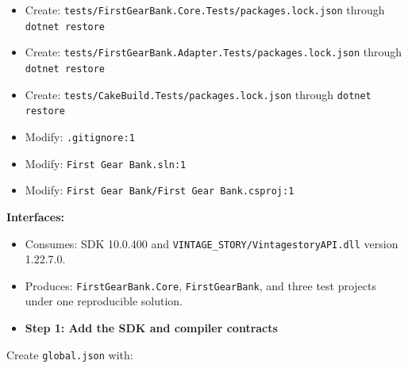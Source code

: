 \documentclass[
  10pt,
  letterpaper,
]{article}
\newcommand{\passthrough}[1]{#1}
\providecommand{\tightlist}{%
  \setlength{\itemsep}{0pt}\setlength{\parskip}{0pt}}
\begin{document}
\begin{itemize}
  Create:
  \texttt{CakeBuild/}\allowbreak{}\texttt{packages.}\allowbreak{}\texttt{lock.}\allowbreak{}\texttt{json}
  through \passthrough{\lstinline!dotnet restore!}
\item
  Create:
  \texttt{tests/}\allowbreak{}\texttt{FirstGearBank.}\allowbreak{}\texttt{Core.}\allowbreak{}\texttt{Tests/}\allowbreak{}\texttt{packages.}\allowbreak{}\texttt{lock.}\allowbreak{}\texttt{json}
  through \passthrough{\lstinline!dotnet restore!}
\item
  Create:
  \texttt{tests/}\allowbreak{}\texttt{FirstGearBank.}\allowbreak{}\texttt{Adapter.}\allowbreak{}\texttt{Tests/}\allowbreak{}\texttt{packages.}\allowbreak{}\texttt{lock.}\allowbreak{}\texttt{json}
  through \passthrough{\lstinline!dotnet restore!}
\item
  Create:
  \texttt{tests/}\allowbreak{}\texttt{CakeBuild.}\allowbreak{}\texttt{Tests/}\allowbreak{}\texttt{packages.}\allowbreak{}\texttt{lock.}\allowbreak{}\texttt{json}
  through \passthrough{\lstinline!dotnet restore!}
\item
  Modify: \passthrough{\lstinline!.gitignore:1!}
\item
  Modify: \passthrough{\lstinline!First Gear Bank.sln:1!}
\item
  Modify:
  \texttt{First\ }\allowbreak{}\texttt{Gear\ }\allowbreak{}\texttt{Bank/}\allowbreak{}\texttt{First\ }\allowbreak{}\texttt{Gear\ }\allowbreak{}\texttt{Bank.}\allowbreak{}\texttt{csproj:}\allowbreak{}\texttt{1}
\end{itemize}

\textbf{Interfaces:}

\begin{itemize}
\tightlist
\item
  Consumes: SDK 10.0.400 and
  \texttt{VINTAGE\_}\allowbreak{}\texttt{STORY/}\allowbreak{}\texttt{VintagestoryAPI.}\allowbreak{}\texttt{dll}
  version 1.22.7.0.
\item
  Produces: \passthrough{\lstinline!FirstGearBank.Core!},
  \passthrough{\lstinline!FirstGearBank!}, and three test projects under
  one reproducible solution.
\end{itemize}

\begin{itemize}
\tightlist
\item[$\square$]
  \textbf{Step 1: Add the SDK and compiler contracts}
\end{itemize}

Create \passthrough{\lstinline!global.json!} with:
\end{document}
